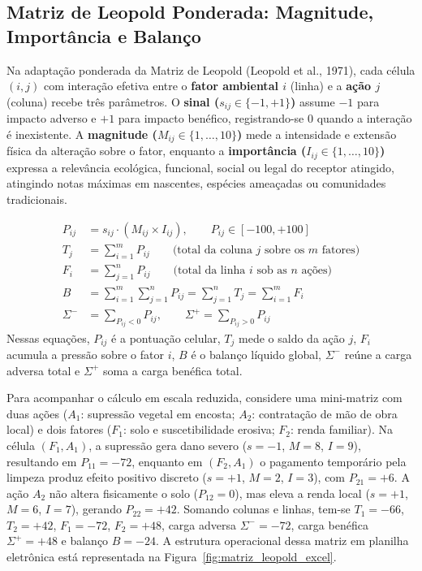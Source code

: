 \subsection{Matriz de Leopold Ponderada: Magnitude, Importância e Balanço}

Na adaptação ponderada da Matriz de Leopold (Leopold et al., 1971), cada célula $(i, j)$ com interação efetiva entre o \textbf{fator ambiental $i$} (linha) e a \textbf{ação $j$} (coluna) recebe três parâmetros. O \textbf{sinal ($s_{ij} \in \{-1, +1\}$)} assume $-1$ para impacto adverso e $+1$ para impacto benéfico, registrando-se $0$ quando a interação é inexistente. A \textbf{magnitude ($M_{ij} \in \{1, \dots, 10\}$)} mede a intensidade e extensão física da alteração sobre o fator, enquanto a \textbf{importância ($I_{ij} \in \{1, \dots, 10\}$)} expressa a relevância ecológica, funcional, social ou legal do receptor atingido, atingindo notas máximas em nascentes, espécies ameaçadas ou comunidades tradicionais.

\begin{boxFormula}
\begin{align*}
  P_{ij} &= s_{ij} \cdot \left(M_{ij} \times I_{ij}\right), \qquad P_{ij} \in [-100, +100] \\[4pt]
  T_j &= \sum_{i=1}^{m} P_{ij} \qquad \text{(total da coluna } j \text{ sobre os } m \text{ fatores)} \\[4pt]
  F_i &= \sum_{j=1}^{n} P_{ij} \qquad \text{(total da linha } i \text{ sob as } n \text{ ações)} \\[4pt]
  B &= \sum_{i=1}^{m}\sum_{j=1}^{n} P_{ij} = \sum_{j=1}^{n} T_j = \sum_{i=1}^{m} F_i \\[4pt]
  \Sigma^{-} &= \sum_{P_{ij}<0} P_{ij}, \qquad \Sigma^{+} = \sum_{P_{ij}>0} P_{ij}
\end{align*}
Nessas equações, $P_{ij}$ é a pontuação celular, $T_j$ mede o saldo da ação $j$, $F_i$ acumula a pressão sobre o fator $i$, $B$ é o balanço líquido global, $\Sigma^{-}$ reúne a carga adversa total e $\Sigma^{+}$ soma a carga benéfica total.
\end{boxFormula}

Para acompanhar o cálculo em escala reduzida, considere uma mini-matriz com duas ações ($A_1$: supressão vegetal em encosta; $A_2$: contratação de mão de obra local) e dois fatores ($F_1$: solo e suscetibilidade erosiva; $F_2$: renda familiar). Na célula $(F_1, A_1)$, a supressão gera dano severo ($s=-1$, $M=8$, $I=9$), resultando em $P_{11} = -72$, enquanto em $(F_2, A_1)$ o pagamento temporário pela limpeza produz efeito positivo discreto ($s=+1$, $M=2$, $I=3$), com $P_{21} = +6$. A ação $A_2$ não altera fisicamente o solo ($P_{12} = 0$), mas eleva a renda local ($s=+1$, $M=6$, $I=7$), gerando $P_{22} = +42$. Somando colunas e linhas, tem-se $T_1 = -66$, $T_2 = +42$, $F_1 = -72$, $F_2 = +48$, carga adversa $\Sigma^{-} = -72$, carga benéfica $\Sigma^{+} = +48$ e balanço $B = -24$. A estrutura operacional dessa matriz em planilha eletrônica está representada na Figura~\ref{fig:matriz_leopold_excel}.

